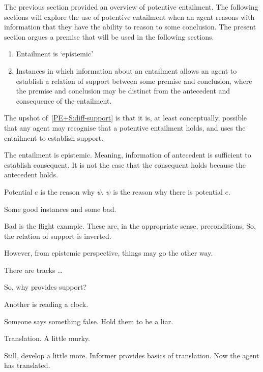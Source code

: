\begin{note}[Overview]
  The previous section provided an overview of potentive entailment.
  The following sections will explore the use of potentive entailment when an agent reasons with information that they have the ability to reason to some conclusion.
  The present section argues a premise that will be used in the following sections.

  \begin{enumerate}
  \item\label{PE+S:epistemic} Entailment is `epistemic'
  \item\label{PE+S:diff-support} Instances in which information about an entailment allows an agent to establish a relation of support between some premise and conclusion, where the premise and conclusion may be distinct from the antecedent and consequence of the entailment.
  \end{enumerate}
  The upshot of~\ref{PE+S:diff-support} is that it is, at least conceptually, possible that any agent may recognise that a potentive entailment holds, and uses the entailment to establish support.
\end{note}

\begin{note}[Epistemic]
  The entailment is epistemic.
  Meaning, information of antecedent is sufficient to establish consequent.
  It is not the case that the consequent holds because the antecedent holds.
\end{note}



\begin{note}
  Potential \(e\) is the reason why \(\psi\).
  \(\psi\) is the reason why there is potential \(e\).

  Some good instances and some bad.

  Bad is the flight example.
  These are, in the appropriate sense, preconditions.
  So, the relation of support is inverted.

  However, from epistemic perspective, things may go the other way.
\end{note}

\begin{note}
  There are tracks \dots

  So, why provides support?

  Another is reading a clock.
\end{note}

\begin{note}[Translation]
  Someone says something false.
  Hold them to be a liar.

  Translation.
  A little murky.

  Still, develop a little more.
  Informer provides basics of translation.
  Now the agent has translated.
\end{note}

